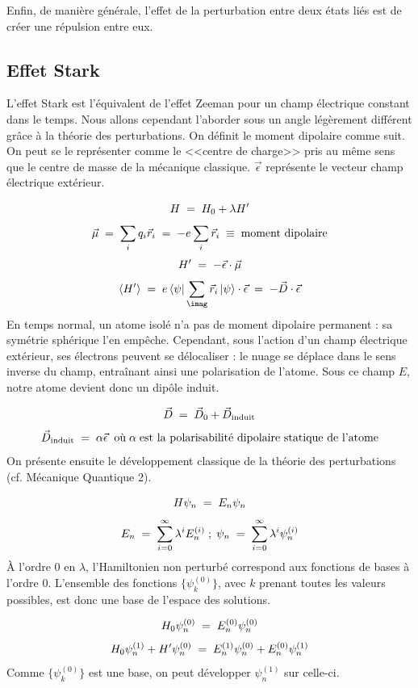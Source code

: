 Enfin, de manière générale, l'effet de la perturbation entre deux états liés est de créer une répulsion entre eux.




\subsection{Effet Stark}

L'effet Stark est l'équivalent de l'effet Zeeman pour un champ électrique constant dans le temps. Nous allons cependant l'aborder sous un angle légèrement différent grâce à la théorie des perturbations. On définit le moment dipolaire comme suit. On peut se le représenter comme le <<centre de charge>> pris au même sens que le centre de masse de la mécanique classique. $\vec{\epsilon}$ représente le vecteur champ électrique extérieur.

\[
    H \; = \; H_0 + \lambda H'
\]
\[
    \vec{\mu} \; = \; \sum_i q_i \vec{r}_i \; = \; -e\sum_i \vec{r}_i\;\equiv\; \textrm{moment dipolaire}
\]
\[
    H' \; = \; -\vec{\epsilon}\cdot\vec{\mu}
\]
\[
    \expval{H'} \eq e\bra{\psi}\sum_\imag\vec{r}_i\ket{\psi}\cdot \vec{\epsilon} \eq -\vec{D}\cdot\vec{\epsilon}
\]
En temps normal, un atome isolé n'a pas de moment dipolaire permanent : sa symétrie sphérique l'en empêche. Cependant, sous l'action d'un champ électrique extérieur, ses électrons peuvent se délocaliser : le nuage se déplace dans le sens inverse du champ, entraînant ainsi une polarisation de l'atome. Sous ce champ $E$, notre atome devient donc un dipôle induit.

\[
    \vec{D} \; = \; \vec{D}_0 + \vec{D}_\text{induit}
\]
\[
    \vec{D}_\text{induit} \; = \; \alpha \vec{\epsilon} \;\; \text{où}\; \alpha \; \text{est la polarisabilité dipolaire statique de l'atome}
\]
On présente ensuite le développement classique de la théorie des perturbations (cf. Mécanique Quantique 2).

\[
    H\psi_n \; = \; E_n \psi_n
\]
\[
    E_n \; = \; \sum_{i=0}^{\infty} \lambda^i E_n^{(i)}\; ; \; \psi_n \; = \; \sum_{i=0}^{\infty} \lambda^i \psi_n^{(i)}
\]
À l'ordre 0 en $\lambda$, l'Hamiltonien non perturbé correspond aux fonctions de bases à l'ordre 0. L'ensemble des fonctions $\{\psi_k^{(0)}\}$, avec $k$ prenant toutes les valeurs possibles, est donc une base de l'espace des solutions.

\[
    H_0 \psi_n^{(0)} \; = \; E_n^{(0)} \psi_n^{(0)}
\]
\[
    H_0 \psi_n^{(1)} + H' \psi_n^{(0)} \; = \; E_n^{(1)} \psi_n^{(0)} + E_n^{(0)} \psi_n^{(1)}
\]
Comme $\{\psi_k^{(0)}\}$ est une base, on peut développer $\psi_n^{(1)}$ sur celle-ci.

